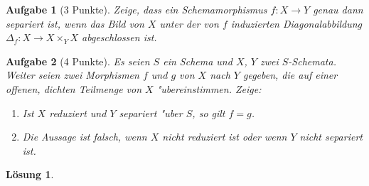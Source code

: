 \documentclass[paper = A4, fontsize=12pt, numbers=noendperiod, chapterprefix=true]{scrbook}
\theoremstyle{break}
\newtheorem{Aufg}{Aufgabe}
\newtheorem{Loes}{L\"osung}
\theoremstyle{nonumberbreak}
\theoremstyle{nonumberplain}
\begin{document}
\begin{Aufg}[3 Punkte]
Zeige, dass ein Schemamorphismus $f\colon X \rightarrow Y$ genau dann separiert ist, wenn das Bild von $X$ unter der von $f$ induzierten Diagonalabbildung $\Delta_f\colon X \rightarrow X \times_Y X$ abgeschlossen ist.
\end{Aufg}

\begin{Aufg}[4 Punkte]
Es seien $S$ ein Schema und $X$, $Y$ zwei $S$-Schemata. Weiter seien zwei Morphismen $f$ und $g$ von $X$ nach $Y$ gegeben, die auf einer offenen, dichten Teilmenge von $X$ "ubereinstimmen. Zeige:
\begin{enumerate}%
 \item Ist $X$ reduziert und $Y$ separiert "uber $S$, so gilt $f = g$.
 \item Die Aussage ist falsch, wenn $X$ nicht reduziert ist oder wenn $Y$ nicht separiert ist.
 \end{enumerate}
 \end{Aufg}

\begin{Loes}
 
\end{Loes}
\end{document}
